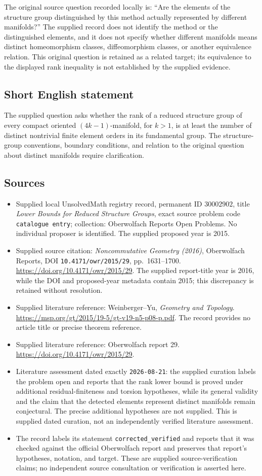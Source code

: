 \documentclass[11pt]{article}
\begin{document}
The original source question recorded locally is: ``Are the elements of the structure group distinguished by this method actually represented by different manifolds?'' The supplied record does not identify the method or the distinguished elements, and it does not specify whether different manifolds means distinct homeomorphism classes, diffeomorphism classes, or another equivalence relation. This original question is retained as a related target; its equivalence to the displayed rank inequality is not established by the supplied evidence.
\subsection{Short English statement}
The supplied question asks whether the rank of a reduced structure group of every compact oriented \((4k-1)\)-manifold, for \(k>1\), is at least the number of distinct nontrivial finite element orders in its fundamental group. The structure-group conventions, boundary conditions, and relation to the original question about distinct manifolds require clarification.
\subsection{Sources}
\begin{itemize}
\item Supplied local UnsolvedMath registry record, permanent ID \(30002902\), title \emph{Lower Bounds for Reduced Structure Groups}, exact source problem code \texttt{catalogue entry}; collection: Oberwolfach Reports Open Problems. No individual proposer is identified. The supplied proposed year is 2015.
\item Supplied source citation: \emph{Noncommutative Geometry (2016)}, Oberwolfach Reports, DOI \texttt{10.4171/owr/2015/29}, pp.~1631--1700. \url{https://doi.org/10.4171/owr/2015/29}. The supplied report-title year is 2016, while the DOI and proposed-year metadata contain 2015; this discrepancy is retained without resolution.
\item Supplied literature reference: Weinberger--Yu, \emph{Geometry and Topology}. \url{https://msp.org/gt/2015/19-5/gt-v19-n5-p08-p.pdf}. The record provides no article title or precise theorem reference.
\item Supplied literature reference: Oberwolfach report 29. \url{https://doi.org/10.4171/owr/2015/29}.
\item Literature assessment dated exactly \texttt{2026-08-21}: the supplied curation labels the problem open and reports that the rank lower bound is proved under additional residual-finiteness and torsion hypotheses, while its general validity and the claim that the detected elements represent distinct manifolds remain conjectural. The precise additional hypotheses are not supplied. This is supplied dated curation, not an independently verified literature assessment.
\item The record labels its statement \texttt{corrected\_verified} and reports that it was checked against the official Oberwolfach report and preserves that report's hypotheses, notation, and target. These are supplied source-verification claims; no independent source consultation or verification is asserted here.
\end{itemize}
\end{document}
